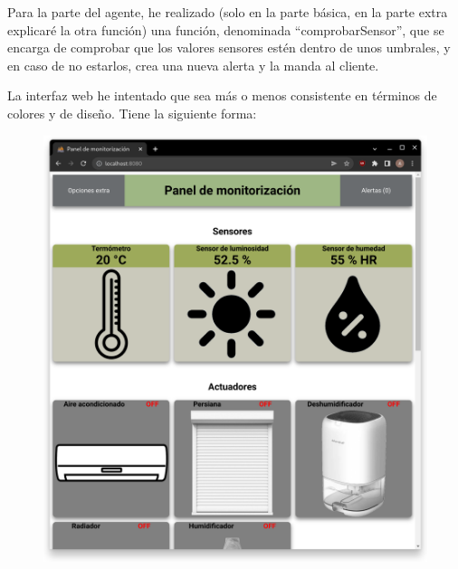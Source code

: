 \documentclass{article}
\begin{document}
Para la parte del agente, he realizado (solo en la parte básica, en la parte extra explicaré la otra función) una función, denominada ``comprobarSensor'', que se encarga de comprobar que los valores sensores estén dentro de unos umbrales, y en caso de no estarlos, crea una nueva alerta y la manda al cliente.

La interfaz web he intentado que sea más o menos consistente en términos de colores y de diseño. Tiene la siguiente forma:

\begin{figure}[H]
    \centering
    \begin{minipage}[H]{0.49\textwidth}
        \centering
        \includegraphics[width=\textwidth]{images/pagina1.png}
    \end{minipage}
    \hfill
    \begin{minipage}[H]{0.49\textwidth}
        \centering

\end{minipage}
\end{figure}
\end{document}
